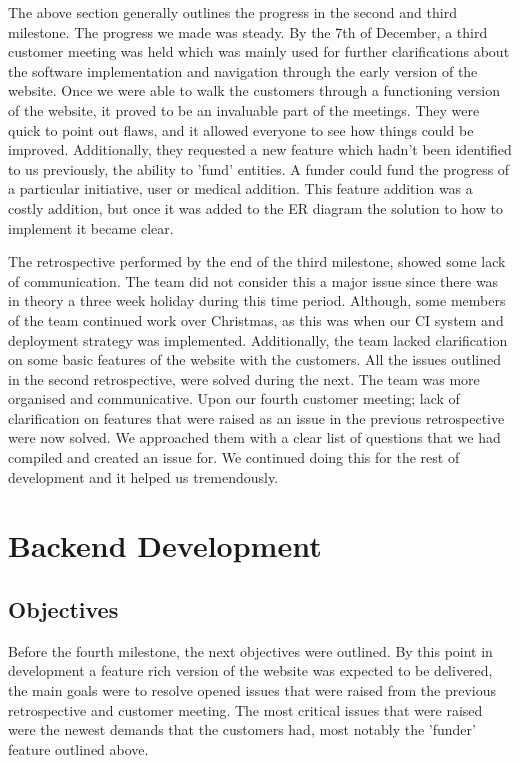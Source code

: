 \documentclass{l3proj}
\begin{document}
The above section generally outlines the progress in the second and third milestone. The progress we made was steady. By the 7th of December, a third customer meeting was held which was mainly used for further clarifications about the software implementation and navigation through the early version of the website. Once we were able to walk the customers through a functioning version of the website, it proved to be an invaluable part of the meetings. They were quick to point out flaws, and it allowed everyone to see how things could be improved. Additionally, they requested a new feature which hadn't been identified to us previously, the ability to 'fund' entities. A funder could fund the progress of a particular initiative, user or medical addition. This feature addition was a costly addition, but once it was added to the ER diagram the solution to how to implement it became clear.

The retrospective performed by the end of the third milestone, showed some lack of communication. The team did not consider this a major issue since there was in theory a three week holiday during this time period. Although, some members of the team continued work over Christmas, as this was when our CI system and deployment strategy was implemented. Additionally, the team lacked clarification on some basic features of the website with the customers. All the issues outlined in the second retrospective, were solved during the next. The team was more organised and communicative. Upon our fourth customer meeting; lack of clarification on features that were raised as an issue in the previous retrospective were now solved. We approached them with a clear list of questions that we had compiled and created an issue for. We continued doing this for the rest of development and it helped us tremendously.

\section{Backend Development}
\label{sec:backend}

\subsection{Objectives}
\label{sec:backend-objectives}

Before the fourth milestone, the next objectives were outlined. By this point in development a feature rich version of the website was expected to be delivered, the main goals were to resolve opened issues that were raised from the previous retrospective and customer meeting. The most critical issues that were raised were the newest demands that the customers had, most notably the 'funder' feature outlined above.
\end{document}
